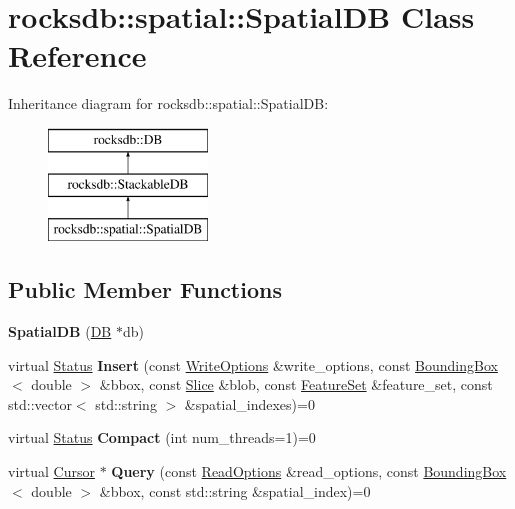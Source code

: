 \hypertarget{classrocksdb_1_1spatial_1_1SpatialDB}{}\section{rocksdb\+:\+:spatial\+:\+:Spatial\+DB Class Reference}
\label{classrocksdb_1_1spatial_1_1SpatialDB}
Inheritance diagram for rocksdb\+:\+:spatial\+:\+:Spatial\+DB\+:\begin{figure}[H]
\begin{center}
\leavevmode
\includegraphics[height=3.000000cm]{classrocksdb_1_1spatial_1_1SpatialDB}
\end{center}
\end{figure}
\subsection*{Public Member Functions}
\begin{DoxyCompactItemize}
\item 
{\bfseries Spatial\+DB} (\hyperlink{classrocksdb_1_1DB}{DB} $\ast$db)\hypertarget{classrocksdb_1_1spatial_1_1SpatialDB_a6c90ffc1ba8d24b8905e6f9295f083b3}{}\label{classrocksdb_1_1spatial_1_1SpatialDB_a6c90ffc1ba8d24b8905e6f9295f083b3}

\item 
virtual \hyperlink{classrocksdb_1_1Status}{Status} {\bfseries Insert} (const \hyperlink{structrocksdb_1_1WriteOptions}{Write\+Options} \&write\+\_\+options, const \hyperlink{structrocksdb_1_1spatial_1_1BoundingBox}{Bounding\+Box}$<$ double $>$ \&bbox, const \hyperlink{classrocksdb_1_1Slice}{Slice} \&blob, const \hyperlink{classrocksdb_1_1spatial_1_1FeatureSet}{Feature\+Set} \&feature\+\_\+set, const std\+::vector$<$ std\+::string $>$ \&spatial\+\_\+indexes)=0\hypertarget{classrocksdb_1_1spatial_1_1SpatialDB_aa5ba141138e335ae0cdadf2385295fb8}{}\label{classrocksdb_1_1spatial_1_1SpatialDB_aa5ba141138e335ae0cdadf2385295fb8}

\item 
virtual \hyperlink{classrocksdb_1_1Status}{Status} {\bfseries Compact} (int num\+\_\+threads=1)=0\hypertarget{classrocksdb_1_1spatial_1_1SpatialDB_a1f5876e94cc14279d28705e7ce79bec4}{}\label{classrocksdb_1_1spatial_1_1SpatialDB_a1f5876e94cc14279d28705e7ce79bec4}

\item 
virtual \hyperlink{classrocksdb_1_1spatial_1_1Cursor}{Cursor} $\ast$ {\bfseries Query} (const \hyperlink{structrocksdb_1_1ReadOptions}{Read\+Options} \&read\+\_\+options, const \hyperlink{structrocksdb_1_1spatial_1_1BoundingBox}{Bounding\+Box}$<$ double $>$ \&bbox, const std\+::string \&spatial\+\_\+index)=0\hypertarget{classrocksdb_1_1spatial_1_1SpatialDB_a1c12e809750730224aee8758040f7aa1}{}\label{classrocksdb_1_1spatial_1_1SpatialDB_a1c12e809750730224aee8758040f7aa1}

\end{DoxyCompactItemize}
